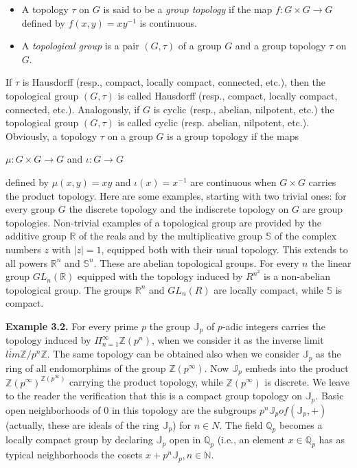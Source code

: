 \documentclass[12pt]{article}
\begin{document}
    
        \begin{itemize}

            \item A topology $\tau$ on $ G $ is said to be a \emph{group topology} if the map $ f : G \times G \to G $ defined by $f(x, y) = xy^{-1}$
            is continuous.

            \item A \emph{topological group} is a pair $ (G, \tau) $ of a group $ G $ and a group topology $\tau$ on $ G $.
        \end{itemize}
        
    
        If $ \tau $ is Hausdorff (resp., compact, locally compact, connected, etc.), then the topological group $ (G, \tau) $ is
    called Hausdorff (resp., compact, locally compact, connected, etc.). Analogously, if $ G $ is cyclic (resp., abelian,
    nilpotent, etc.) the topological group $ (G, \tau) $ is called cyclic (resp. abelian, nilpotent, etc.). Obviously, a topology
    $ \tau $ on a group $ G $ is a group topology if the maps 
    

    $ \mu : G\times G \to G $ and $\iota : G \to G$


    defined by $ \mu(x, y) = xy $ and $ \iota(x) = x^{-1} $ are continuous when $ G \times G $ carries the product topology.
    Here are some examples, starting with two trivial ones: for every group $ G $ the discrete topology and the
    indiscrete topology on $ G $ are group topologies. Non-trivial examples of a topological group are provided by the
    additive group $ \mathbb{R} $ of the reals and by the multiplicative group $ \mathbb{S} $ of the complex numbers $ z $ with $ |z| = 1 $, equipped
    both with their usual topology. This extends to all powers $ \mathbb{R}^n $ and $ \mathbb{S}^n$. These are abelian topological groups.
    For every $ n $ the linear group $GL_n (\mathbb{R})$ equipped with the topology induced by $R^{n^2}$ is a non-abelian topological
    group. The groups $\mathbb{R}^n$ and $GL_n (R)$ are locally compact, while $\mathbb{S}$ is compact.


    \textbf{Example 3.2.} For every prime $ p $ the group $\mathbb{J}_p$ of $p$-adic integers carries the topology induced by $ \Pi^{\infty}_{n=1} \mathbb{Z}(p^n) $,
    when we consider it as the inverse limit $\underleftarrow{lim} \mathbb{Z}/p^n \mathbb{Z}$. The same topology can be obtained also when we consider $\mathbb{J}_p$
    as the ring of all endomorphims of the group $\mathbb{Z}(p^{\infty})$. Now $\mathbb{J}_p$ embeds into the product $\mathbb{Z}(p^{\infty})^{\mathbb{Z}(p^{\infty})}$ carrying the
    product topology, while $\mathbb{Z}(p^{\infty})$ is discrete. We leave to the reader the verification that this is a compact group
    topology on $\mathbb{J}_p$. Basic open neighborhoods of 0 in this topology are the subgroups $ p^n \mathbb{J}_p of (\mathbb{J}_p, +) $ (actually,
    these are ideals of the ring $\mathbb{J}_p$) for $n \in N$. The field $\mathbb{Q}_p$ becomes a locally compact group by declaring $\mathbb{J}_p$ open
    in $\mathbb{Q}_p$ (i.e., an element $x \in \mathbb{Q}_p$ has as typical neighborhoods the cosets $x + p^n \mathbb{J}_p, n \in \mathbb{N}$.
    
\end{document}
